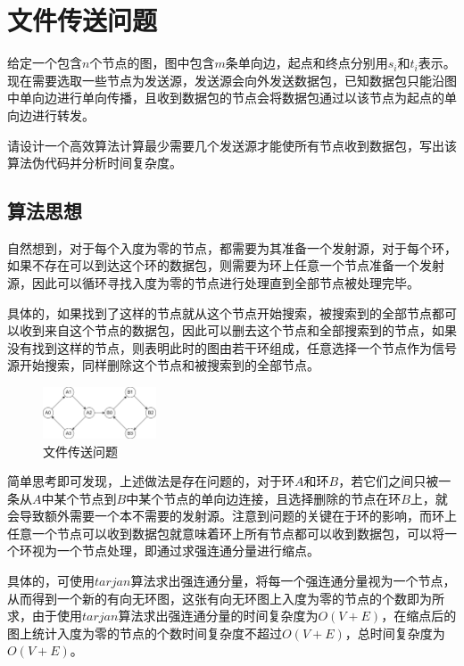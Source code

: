 \documentclass{article}
\begin{document}
\section{文件传送问题}

给定一个包含$n$个节点的图，图中包含$m$条单向边，起点和终点分别用$s_i$和$t_i$表示。现在需要选取一些节点为发送源，发送源会向外发送数据包，已知数据包只能沿图中单向边进行单向传播，且收到数据包的节点会将数据包通过以该节点为起点的单向边进行转发。

请设计一个高效算法计算最少需要几个发送源才能使所有节点收到数据包，写出该算法伪代码并分析时间复杂度。

\subsection{算法思想}

自然想到，对于每个入度为零的节点，都需要为其准备一个发射源，对于每个环，如果不存在可以到达这个环的数据包，则需要为环上任意一个节点准备一个发射源，因此可以循环寻找入度为零的节点进行处理直到全部节点被处理完毕。

具体的，如果找到了这样的节点就从这个节点开始搜索，被搜索到的全部节点都可以收到来自这个节点的数据包，因此可以删去这个节点和全部搜索到的节点，如果没有找到这样的节点，则表明此时的图由若干环组成，任意选择一个节点作为信号源开始搜索，同样删除这个节点和被搜索到的全部节点。

\begin{figure}[H]
\centering
\includegraphics[width=0.3\textwidth]{algorithm_pic3.jpg}
\caption{文件传送问题}
\label{文件传送问题}
\end{figure}

简单思考即可发现，上述做法是存在问题的，对于环$A$和环$B$，若它们之间只被一条从$A$中某个节点到$B$中某个节点的单向边连接，且选择删除的节点在环$B$上，就会导致额外需要一个本不需要的发射源。注意到问题的关键在于环的影响，而环上任意一个节点可以收到数据包就意味着环上所有节点都可以收到数据包，可以将一个环视为一个节点处理，即通过求强连通分量进行缩点。

具体的，可使用$tarjan$算法求出强连通分量，将每一个强连通分量视为一个节点，从而得到一个新的有向无环图，这张有向无环图上入度为零的节点的个数即为所求，由于使用$tarjan$算法求出强连通分量的时间复杂度为$O(V+E)$，在缩点后的图上统计入度为零的节点的个数时间复杂度不超过$O(V+E)$，总时间复杂度为$O(V+E)$。
\end{document}
